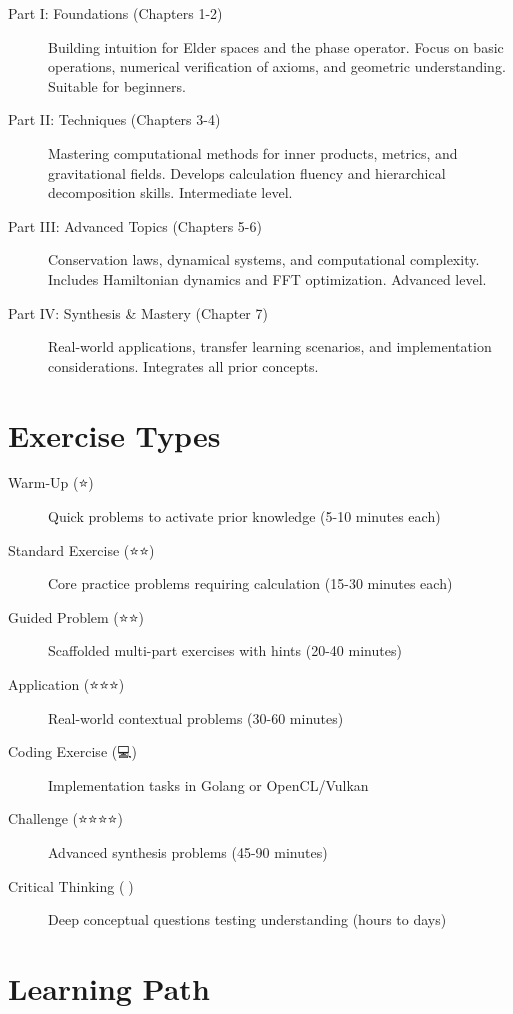 \documentclass[12pt,a4paper,openany]{book}
\theoremstyle{definition}
\theoremstyle{remark}
\begin{document}
\begin{description}
\item[Part I: Foundations (Chapters 1-2)] Building intuition for Elder spaces and the phase operator. Focus on basic operations, numerical verification of axioms, and geometric understanding. Suitable for beginners.

\item[Part II: Techniques (Chapters 3-4)] Mastering computational methods for inner products, metrics, and gravitational fields. Develops calculation fluency and hierarchical decomposition skills. Intermediate level.

\item[Part III: Advanced Topics (Chapters 5-6)] Conservation laws, dynamical systems, and computational complexity. Includes Hamiltonian dynamics and FFT optimization. Advanced level.

\item[Part IV: Synthesis \& Mastery (Chapter 7)] Real-world applications, transfer learning scenarios, and implementation considerations. Integrates all prior concepts.
\end{description}

\section*{Exercise Types}

\begin{description}
\item[Warm-Up (⭐)] Quick problems to activate prior knowledge (5-10 minutes each)
\item[Standard Exercise (⭐⭐)] Core practice problems requiring calculation (15-30 minutes each)
\item[Guided Problem (⭐⭐)] Scaffolded multi-part exercises with hints (20-40 minutes)
\item[Application (⭐⭐⭐)] Real-world contextual problems (30-60 minutes)
\item[Coding Exercise (💻)] Implementation tasks in Golang or OpenCL/Vulkan
\item[Challenge (⭐⭐⭐⭐)] Advanced synthesis problems (45-90 minutes)
\item[Critical Thinking (🧠)] Deep conceptual questions testing understanding (hours to days)
\end{description}

\section*{Learning Path}
\end{document}
